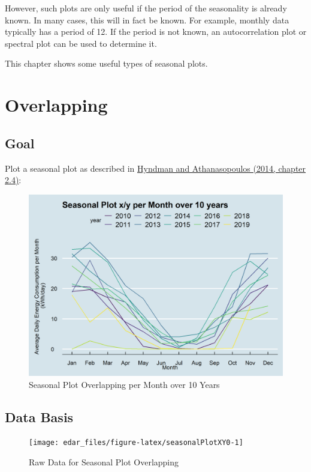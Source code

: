\documentclass[
  a4paperpaper,
]{book}
\begin{document}
However, such plots are only useful if the period of the seasonality is already known. In many cases, this will in fact be known. For example, monthly data typically has a period of 12. If the period is not known, an autocorrelation plot or spectral plot can be used to determine it.

This chapter shows some useful types of seasonal plots.

\hypertarget{overlapping}{%
\section{Overlapping}\label{overlapping}}

\hypertarget{goal-6}{%
\subsection{Goal}\label{goal-6}}

Plot a seasonal plot as described in \href{https://otexts.com/fpp2/seasonal-plots.html}{Hyndman and Athanasopoulos (2014, chapter 2.4)}:

\begin{figure}
\includegraphics[width=0.7\linewidth]{images/plotSeasonalXY} \caption{Seasonal Plot Overlapping per Month over 10 Years}\label{fig:unnamed-chunk-16}
\end{figure}

\hypertarget{data-basis-6}{%
\subsection{Data Basis}\label{data-basis-6}}

\begin{figure}
\texttt{[image: edar\_files/figure-latex/seasonalPlotXY0-1]} \caption{Raw Data for Seasonal Plot Overlapping}\label{fig:seasonalPlotXY0}
\end{figure}
\end{document}
